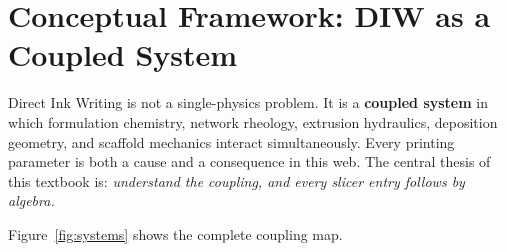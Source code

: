 \documentclass[11pt,a4paper]{article}
\begin{document}
\section*{Conceptual Framework: DIW as a Coupled System}
\label{sec:framework}

Direct Ink Writing is not a single-physics problem. It is a
\textbf{coupled system} in which formulation chemistry, network
rheology, extrusion hydraulics, deposition geometry, and scaffold
mechanics interact simultaneously. Every printing parameter is both a
cause and a consequence in this web. The central thesis of this textbook
is: \emph{understand the coupling, and every slicer entry follows by
algebra.}

Figure~\ref{fig:systems} shows the complete coupling map.
\end{document}
